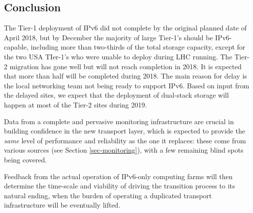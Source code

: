 \subsection{Conclusion}
\par

The Tier-1 deployment of IPv6 did not complete by the original planned date of
April 2018, but by December the majority of large Tier-1's should be IPv6-capable, including more than two-thirds of the total storage capacity,
except for the two USA TIer-1's who were unable to deploy during LHC running.
The Tier-2 migration has gone well but will not reach completion in 2018. It is expected that more than half will be completed during 2018. 
The main reason for delay is the local networking team not being ready
to support IPv6. Based on input from the delayed sites, we expect that the deployment of dual-stack storage will
happen at most of the Tier-2 sites during 2019.

Data from
a complete and pervasive monitoring infrastructure are crucial in building
confidence in the new transport layer, which is expected to provide the
{\it same} level of performance and reliability as the one it replaces: these
come from various sources (see Section \ref{sec-monitoring}), with a few
remaining blind spots being covered.
\par
Feedback from the actual operation of  
IPv6-only computing farms will then determine the time-scale and viability of
driving the transition process to its natural ending, when the burden
of operating a duplicated transport infrastructure will be eventually lifted.

